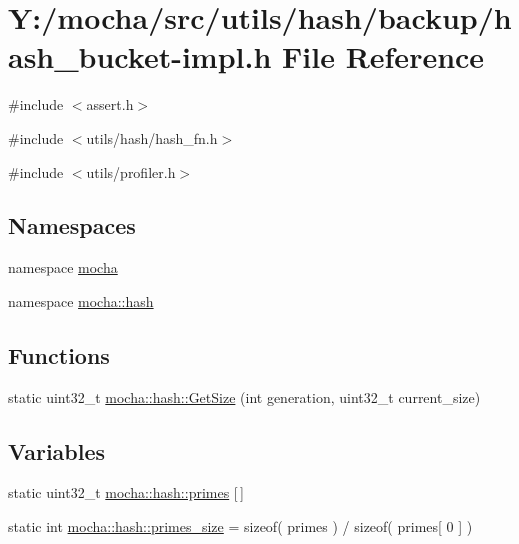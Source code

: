 \hypertarget{hash__bucket-impl_8h}{
\section{Y:/mocha/src/utils/hash/backup/hash\_\-bucket-\/impl.h File Reference}
\label{hash__bucket-impl_8h}
}
{\ttfamily \#include $<$assert.h$>$}\par
{\ttfamily \#include $<$utils/hash/hash\_\-fn.h$>$}\par
{\ttfamily \#include $<$utils/profiler.h$>$}\par
\subsection*{Namespaces}
\begin{DoxyCompactItemize}
\item 
namespace \hyperlink{namespacemocha}{mocha}
\item 
namespace \hyperlink{namespacemocha_1_1hash}{mocha::hash}
\end{DoxyCompactItemize}
\subsection*{Functions}
\begin{DoxyCompactItemize}
\item 
static uint32\_\-t \hyperlink{namespacemocha_1_1hash_a8e68a95c40dab7240178d75e5015d9b3}{mocha::hash::GetSize} (int generation, uint32\_\-t current\_\-size)
\end{DoxyCompactItemize}
\subsection*{Variables}
\begin{DoxyCompactItemize}
\item 
static uint32\_\-t \hyperlink{namespacemocha_1_1hash_a98b9570ac5f7d3eb6f5f82f9448048d4}{mocha::hash::primes} \mbox{[}$\,$\mbox{]}
\item 
static int \hyperlink{namespacemocha_1_1hash_a0dac030627349b25de202009e31652e6}{mocha::hash::primes\_\-size} = sizeof( primes ) / sizeof( primes\mbox{[} 0 \mbox{]} )
\end{DoxyCompactItemize}
